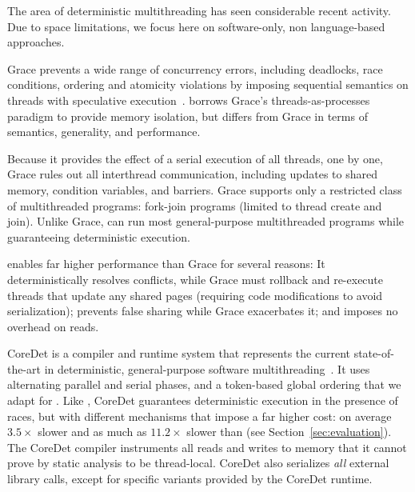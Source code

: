 \label{sec:related-work}

The area of deterministic multithreading has seen considerable recent
activity. Due to space limitations, we focus here on software-only,
non language-based approaches.


Grace prevents a wide range of concurrency errors, including
deadlocks, race conditions, ordering and atomicity violations by imposing
sequential semantics on threads with speculative execution~\cite{grace}.  \dthreads{} borrows Grace's
threads-as-processes paradigm to provide memory isolation, but differs from Grace in terms of semantics, generality, and performance.

Because it provides the effect of a serial execution of all threads,
one by one, Grace rules out all interthread communication, including
updates to shared memory, condition variables, and barriers. Grace
supports only a restricted class of multithreaded programs: fork-join
programs (limited to thread create and join). Unlike
Grace, \dthreads{} can run most general-purpose multithreaded programs
while guaranteeing deterministic execution.

\dthreads{} enables far higher performance than Grace for several reasons:
It deterministically resolves conflicts, while Grace must rollback and re-execute threads that update any shared pages (requiring code modifications to avoid serialization); 
\dthreads{} prevents false sharing while Grace exacerbates it; and 
\dthreads{} imposes no overhead on reads.

CoreDet is a compiler and runtime system that represents the current
state-of-the-art in deterministic, general-purpose software
multithreading~\cite{Bergan:2010:CCR:1736020.1736029}. It uses
alternating parallel and serial phases, and a token-based global
ordering that we adapt for \dthreads{}. Like \dthreads{}, CoreDet
guarantees deterministic execution in the presence of races, but with
different mechanisms that impose a far higher cost: on average
$3.5\times$ slower and as much as $11.2\times$ slower than \dthreads{} (see
Section~\ref{sec:evaluation}). The CoreDet compiler instruments all
reads and writes to memory that it cannot prove by static analysis to
be thread-local.  CoreDet also serializes \emph{all} external library
calls, except for specific variants provided by the CoreDet runtime.


